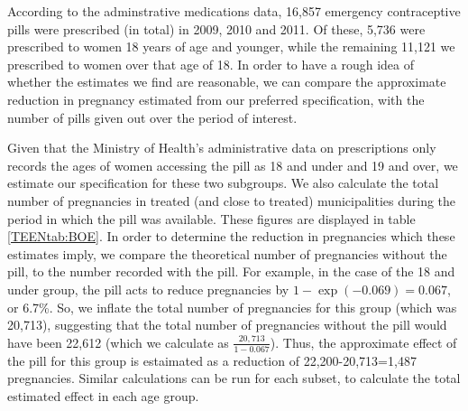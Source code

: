 \documentclass[11pt,subeqn]{article}
\begin{document}
\begin{spacing}{1.4}
According to the adminstrative medications data, 16,857 emergency 
contraceptive pills were prescribed (in total) in 2009, 2010 and 2011. Of 
these, 5,736 were prescribed to women 18 years of age and younger, while the
remaining 11,121 we prescribed to women over that age of 18.  In order to have
a rough idea of whether the estimates we find are reasonable, we can compare
the approximate reduction in pregnancy estimated from our preferred 
specification, with the number of pills given out over the period of interest.

Given that the Ministry of Health's administrative data on prescriptions only
records the ages of women accessing the pill as 18 and under and 19 and over,
we estimate our specification for these two subgroups.  We also
calculate the total number of pregnancies in treated (and close to treated)
municipalities during the period in which the pill was available.  These 
figures are displayed in table \ref{TEENtab:BOE}.  In order to determine the
reduction in pregnancies which these estimates imply, we compare the 
theoretical number of pregnancies without the pill, to the number recorded 
with the pill.  For example, in the case of the 18 and under group, the pill acts 
to reduce pregnancies by $1-\exp(-0.069)=0.067$, or 6.7\%.  So, we inflate the 
total number of pregnancies for this group (which was 20,713), suggesting that 
the total number of pregnancies without the pill would have been 22,612 (which
we calculate as $\frac{20,713}{1-0.067}$).  Thus, the approximate effect of the 
pill for this group is estaimated as a reduction of 22,200-20,713=1,487
pregnancies.  Similar calculations can be run for each subset, to calculate the
total estimated effect in each age group.


\end{spacing}
\end{document}
